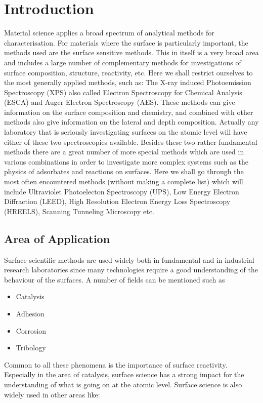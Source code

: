 \chapter{Introduction}
Material science applies a broad spectrum of analytical methods for characterisation. For materials where the surface is particularly important, the methods used are the surface sensitive methods. This in itself is a very broad area and includes a large number of complementary methods for investigations of surface composition, structure, reactivity, etc. Here we shall restrict ourselves to the most generally applied methods, such as: The X-ray induced Photoemission Spectroscopy (XPS) also called Electron Spectroscopy for Chemical Analysis (ESCA) and Auger Electron Spectroscopy (AES). These methods can give information on the surface composition and chemistry, and combined with other methods also give information on the lateral and depth composition. Actually any laboratory that is seriously investigating surfaces on the atomic level will have either of these two spectroscopies available. Besides these two rather fundamental methods there are a great number of more special methods which are used in various combinations in order to investigate more complex systems such as the physics of adsorbates and reactions on surfaces. Here we shall go through the most often encountered methods (without making a complete list) which will include Ultraviolet Photoelecton Spectroscopy (UPS), Low Energy Electron Diffraction (LEED), High Resolution Electron Energy Loss Spectroscopy (HREELS), Scanning Tunneling Microscopy etc. 

\section{Area of Application}
Surface scientific methods are used widely both in fundamental and in industrial research laboratories since many technologies require a good understanding of the behaviour of the surfaces. A number of fields can be mentioned such as

\begin{itemize}
\item Catalysis
\item Adhesion
\item Corrosion
\item Tribology
\end{itemize}

Common to all these phenomena is the importance of surface reactivity. Especially in the area of catalysis, surface science has a strong impact for the understanding of what is going on at the atomic level. Surface science is also widely used in other areas like:

